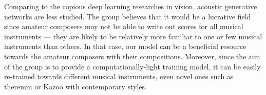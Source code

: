\begin{par}
    \par \hspace{15pt} Comparing to the copious deep learning researches in vision, acoustic generative networks are less studied. The group believes that it would be a lucrative field since amateur composers may not be able to write out scores for all musical instruments --- they are likely to be relatively more familiar to one or few musical instruments than others. In that case, our model can be a beneficial resource towards the amateur composers with their compositions. Moreover, since the aim of the group is to provide a computationally-light training model, it can be easily re-trained towards different musical instruments, even novel ones such as theremin or Kazoo with contemporary styles. 
    

\end{par}
